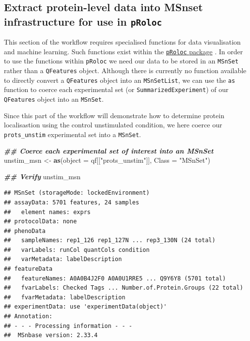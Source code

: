 \documentclass[9pt,a4paper,]{extarticle}
\newenvironment{Shaded}{\begin{snugshade}}{\end{snugshade}}
\newcommand{\AttributeTok}[1]{\textcolor[rgb]{0.13,0.29,0.53}{#1}}
\newcommand{\DocumentationTok}[1]{\textcolor[rgb]{0.56,0.35,0.01}{\textbf{\textit{#1}}}}
\newcommand{\FunctionTok}[1]{\textcolor[rgb]{0.13,0.29,0.53}{\textbf{#1}}}
\newcommand{\NormalTok}[1]{#1}
\newcommand{\OtherTok}[1]{\textcolor[rgb]{0.56,0.35,0.01}{#1}}
\newcommand{\StringTok}[1]{\textcolor[rgb]{0.31,0.60,0.02}{#1}}
\begin{document}
\subsection{\texorpdfstring{Extract protein-level data into MSnset infrastructure for use in \texttt{pRoloc}}{Extract protein-level data into MSnset infrastructure for use in pRoloc}}\label{extract-protein-level-data-into-msnset-infrastructure-for-use-in-proloc}

This section of the workflow requires specialised functions for data visualisation
and machine learning. Such functions exist within the \href{https://www.bioconductor.org/packages/release/bioc/html/pRoloc.html}{\texttt{pRoloc} package} \citep{pRoloc2014}.
In order to use the functions within \texttt{pRoloc} we need our data to be stored in
an \texttt{MSnSet} rather than a \texttt{QFeatures} object. Although there is currently no
function available to directly convert a \texttt{QFeatures} object into an \texttt{MSnSetList},
we can use the \texttt{as} function to coerce each experimental set (or \texttt{SummarizedExperiment})
of our \texttt{QFeatures} object into an \texttt{MSnSet}.

Since this part of the workflow will demonstrate how to determine protein
localisastion using the control unstimulated condition, we here coerce our
\texttt{prots\_unstim} experimental set into a \texttt{MSnSet}.

\begin{Shaded}
\begin{Highlighting}[]
\DocumentationTok{\#\# Coerce each experimental set of interest into an MSnSet}
\NormalTok{unstim\_msn }\OtherTok{\textless{}{-}} \FunctionTok{as}\NormalTok{(}\AttributeTok{object =}\NormalTok{ qf[[}\StringTok{"prots\_unstim"}\NormalTok{]], }\AttributeTok{Class =} \StringTok{"MSnSet"}\NormalTok{)}

\DocumentationTok{\#\# Verify}
\NormalTok{unstim\_msn}
\end{Highlighting}
\end{Shaded}

\begin{verbatim}
## MSnSet (storageMode: lockedEnvironment)
## assayData: 5701 features, 24 samples 
##   element names: exprs 
## protocolData: none
## phenoData
##   sampleNames: rep1_126 rep1_127N ... rep3_130N (24 total)
##   varLabels: runCol quantCols condition
##   varMetadata: labelDescription
## featureData
##   featureNames: A0A0B4J2F0 A0A0U1RRE5 ... Q9Y6Y8 (5701 total)
##   fvarLabels: Checked Tags ... Number.of.Protein.Groups (22 total)
##   fvarMetadata: labelDescription
## experimentData: use 'experimentData(object)'
## Annotation:  
## - - - Processing information - - -
##  MSnbase version: 2.33.4
\end{verbatim}
\end{document}
